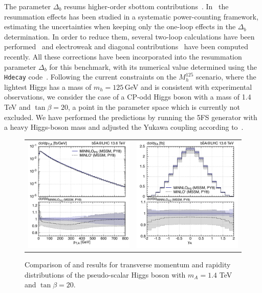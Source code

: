 \documentclass[11pt,a4paper]{article}
\begin{document}
The parameter $ \Delta_b $ resums higher-order sbottom contributions~\cite{Banks:1987iu,Hall:1993gn,Carena:1994bv,Carena:2000uj,Guasch:2003cv}. In~ the resummation effects has been studied in a systematic power-counting framework, estimating the uncertainties when keeping only the one-loop effects in the $ \Delta_b $ determination. In order to reduce them, several two-loop calculations have been performed~\cite{Noth:2008tw,Noth:2010jy,Mihaila:2010mp,Crivellin:2012zz} and electroweak and diagonal contributions~\cite{Ghezzi:2017enb} have been computed recently.  All these corrections have been incorporated into the resummation parameter $ \Delta_b $ for this benchmark, with its numerical value determined using the \texttt{Hdecay} code~\cite{Djouadi:1997yw,Djouadi:2018xqq}. 
Following the current constraints on the $M_h^{125}$ scenario, where the lightest Higgs has a mass of $m_h= 125$\,GeV and is consistent with experimental observations, we consider the case of a CP-odd Higgs boson with a mass of 1.4 TeV and $\tan\beta = 20$, a point in the parameter space which is currently not excluded. 
We have performed the predictions by running the \minnlo{} 5FS generator with a heavy Higgs-boson mass and adjusted the Yukawa coupling according to~.

\begin{figure}[t!]
\begin{center}
\begin{tabular}{cc}
\includegraphics[width=.45\textwidth, page=1]{plots/5fs/BSM/pt_Higgs__A-1400GeV-PY8-kQ0.pdf}&
\includegraphics[width=.45\textwidth, page=1]{plots/5fs/BSM/y_Higgs__A-1400GeV-PY8-kQ0.pdf}
\end{tabular}
\vspace*{1ex}
\caption{Comparison of \minlo{} and \minnlo{} results for transverse momentum and rapidity distributions of the pseudo-scalar Higgs boson with $m_A=1.4$ TeV and $\tan\beta=20$. \label{fig:MiNLOBSM}}
\end{center}
\end{figure}
\end{document}
